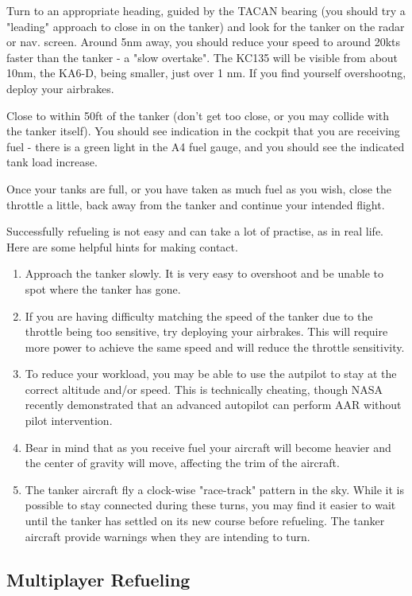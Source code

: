 \begin{enumerate}
Turn to an appropriate heading, guided by the TACAN bearing (you should
try a "leading" approach to close in on the tanker) and look for the
tanker on the radar or nav. screen.  Around 5nm away, you should reduce
your speed to around 20kts faster than the tanker - a "slow overtake".  The
KC135 will be visible from about 10nm, the KA6-D, being smaller, just over 1 nm.
If you find yourself overshootng, deploy your airbrakes.

Close to within 50ft of the tanker (don't get too close, or you may collide with
the tanker itself).  You should see indication in
the cockpit that you are receiving fuel - there is a green light in the
A4 fuel gauge, and you should see the indicated tank load increase.

Once your tanks are full, or you have taken as much fuel as you wish,
close the throttle a little, back away from the tanker and continue
your intended flight.

Successfully refueling is not easy and can take a lot of practise, as in real
life. Here are some helpful hints for making contact.

\begin{enumerate}
\item Approach the tanker slowly. It is very easy to overshoot and be unable to
spot where the tanker has gone.
\item If you are having difficulty matching the speed of the tanker due to the
throttle being too sensitive, try deploying your airbrakes. This will require
more power to achieve the same speed and will reduce the throttle sensitivity.
\item To reduce your workload, you may be able to use the autpilot to stay at
the correct altitude and/or speed. This is technically cheating, though NASA
recently demonstrated that an advanced autopilot can perform AAR without pilot
intervention.
\item Bear in mind that as you receive fuel your aircraft will become heavier
and the center of gravity will move, affecting the trim of the aircraft.
\item The tanker aircraft fly a clock-wise "race-track" pattern in the sky.
While it is possible to stay connected during these turns, you may find it
easier to wait until the tanker has settled on its new course before refueling.
The tanker aircraft provide warnings when they are intending to turn.
\end{enumerate}

\subsection{Multiplayer Refueling}


\end{enumerate}
